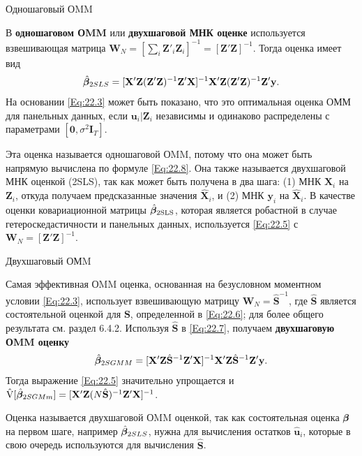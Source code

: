 {\centering Одношаговый ОMM}

В \textbf{одношаговом ОMM} или \textbf{двухшаговой МНК оценке} используется взвешивающая матрица $\mathbf W_N=[\sum_i \mathbf Z'_i \mathbf Z_i]^{-1}=[\mathbf Z' \mathbf Z]^{-1}$.  Тогда оценка имеет вид
\begin{align}
\hat{\bm{\beta}}_{2SLS} = [\mathbf X' \mathbf Z ( \mathbf Z' \mathbf Z)^{-1} \mathbf Z' \mathbf X]^{-1} \mathbf X' \mathbf Z (\mathbf Z' \mathbf Z)^{-1} \mathbf Z' \mathbf y.
\label{Eq:22.8}
\end{align}
На основании \ref{Eq:22.3} может быть показано, что это оптимальная оценка ОММ для панельных данных, если $\mathbf u_i | \mathbf Z_i$ независимы и одинаково распределены  с параметрами $[\mathbf 0, \sigma^2 \mathbf I_T]$.

Эта оценка называется одношаговой ОMM, потому что она может быть напрямую вычислена по формуле \ref{Eq:22.8}. Она также называется двухшаговой МНК оценкой (2SLS), так как может быть получена в два шага: (1) МНК $\mathbf X_i$ на $\mathbf Z_i$, откуда получаем предсказанные значения $\hat{\mathbf X}_i$, и (2) МНК $\mathbf y_i$ на $\hat{\mathbf X}_i$. В качестве оценки ковариационной матрицы $\hat{\bm{\beta}}_{\mathrm{2SLS}}$, которая является робастной в случае гетероскедастичности и панельных данных, используется \ref{Eq:22.5} с $\mathbf W_N=[\mathbf Z' \mathbf Z]^{-1}$.

{\centering Двухшаговый ОМM}

Самая эффективная ОMM оценка, основанная на безусловном моментном условии \ref{Eq:22.3}, использует взвешивающую матрицу $\mathbf W_N=\hat{\mathbf S}^{-1}$, где $\hat{\mathbf S}$  является состоятельной оценкой для $\mathbf S$, определенной в \ref{Eq:22.6}; для более общего результата см. раздел 6.4.2. Используя $\hat{\mathbf S}$ в \ref{Eq:22.7}, получаем \textbf{двухшаговую ОMM оценку}
\begin{align}
\hat{\bm{\beta}}_{2SGMM} = [\mathbf X' \mathbf Z \hat{\mathbf S}^{-1} \mathbf Z' \mathbf X]^{-1} \mathbf X' \mathbf Z \hat{\mathbf S}^{-1} \mathbf Z' \mathbf y.
\label{Eq:22.8}
\end{align}
Тогда выражение \ref{Eq:22.5} значительно упрощается и $\hat{\mathrm V}[\hat{\bm{\beta}}_{2SGMm}]=[\mathbf X' \mathbf Z (N \hat{\mathbf S})^{-1} \mathbf Z' \mathbf X]^{-1}$.

Оценка называется двухшаговой ОMM оценкой, так как состоятельная оценка $\bm{\beta}$ на первом шаге, например $\hat{\bm{\beta}}_{\mathrm 2SLS}$, нужна для вычисления остатков $\hat{\mathbf u}_i$, которые в свою очередь используются для вычисления $\hat{\mathbf S}$.

